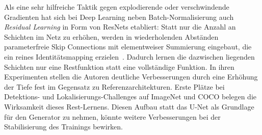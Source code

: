 Als eine sehr hilfreiche Taktik gegen explodierende oder verschwindende Gradienten hat sich bei Deep Learning neben Batch-Normalisierung auch \emph{Residual Learning} in Form von ResNets etabliert:
Statt nur die Anzahl an Schichten im Netz zu erhöhen, werden in wiederholenden Abständen parameterfreie Skip Connections mit elementweiser Summierung eingebaut, die ein reines Identitätsmapping erzielen~\cite{He.2016}.
Dadurch lernen die dazwischen liegenden Schichten nur eine Restfunktion statt eine vollständige Funktion.
In ihren Experimenten stellen die Autoren deutliche Verbesserungen durch eine Erhöhung der Tiefe fest im Gegensatz zu Referenzarchitekturen.
Erste Plätze bei Detektions- und Lokalisierungs-Challenges auf ImageNet und COCO belegen die Wirksamkeit dieses Rest-Lernens.
Diesen Aufbau statt das U-Net als Grundlage für den Generator zu nehmen, könnte weitere Verbesserungen bei der Stabilisierung des Trainings bewirken.


